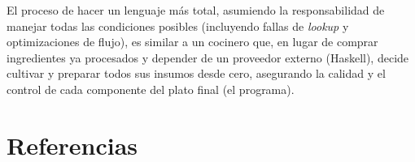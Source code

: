 \documentclass[a4paper,12pt]{article}
\begin{document}
\begin{tcolorbox}[title= Conclusiones     MÓDULO D3, breakable]
\medskip

\noindent
El proceso de hacer un lenguaje más total, asumiendo la responsabilidad de manejar todas las condiciones posibles (incluyendo fallas de \textit{lookup} y optimizaciones de flujo), es similar a un cocinero que, en lugar de comprar ingredientes ya procesados y depender de un proveedor externo (Haskell), decide cultivar y preparar todos sus insumos desde cero, asegurando la calidad y el control de cada componente del plato final (el programa).
\end{tcolorbox}



\newpage
\section{Referencias}
\end{document}
